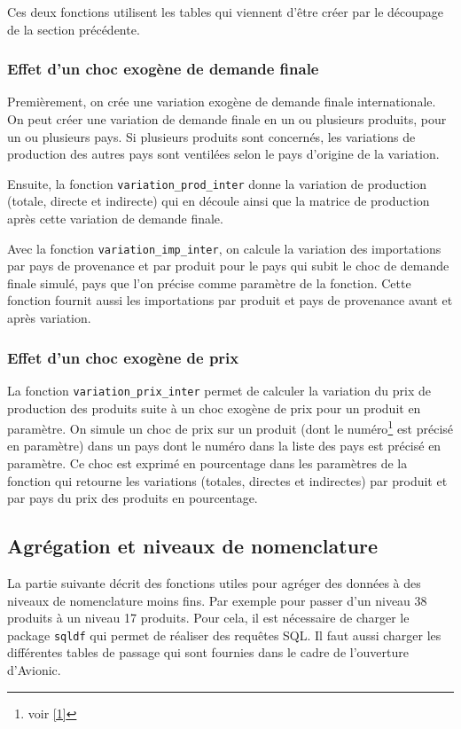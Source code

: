 \documentclass[a4paper,french,11pt]{article}
\begin{document}
Ces deux fonctions utilisent les tables qui viennent d'\^etre cr\'eer par le d\'ecoupage de la section pr\'ec\'edente.

\subsubsection{Effet d'un choc exog\`ene de demande finale}

Premi\`erement, on cr\'ee une variation exog\`ene de demande finale internationale. On peut cr\'eer une variation de demande finale en un ou plusieurs produits, pour un ou plusieurs pays. Si plusieurs produits sont concern\'es, les variations de production des autres pays sont ventil\'ees selon le pays d'origine de la variation.

Ensuite, la fonction \verb|variation_prod_inter| donne la variation de production (totale, directe et indirecte) qui en d\'ecoule ainsi que la matrice de production apr\`es cette variation de demande finale.

Avec la fonction \verb|variation_imp_inter|, on calcule la variation des importations par pays de provenance et par produit pour le pays qui subit le choc de demande finale simul\'e, pays que l'on pr\'ecise comme param\`etre de la fonction. Cette fonction fournit aussi les importations par produit et pays de provenance avant et apr\`es variation.

\subsubsection{Effet d'un choc exog\`ene de prix}

La fonction \verb|variation_prix_inter| permet de calculer la variation du prix de production des produits suite \`a un choc exog\`ene de prix pour un produit en param\`etre. On simule un choc de prix sur un produit (dont le num\'ero\footnote{voir \ref{1}} est pr\'ecis\'e en param\`etre) dans un pays dont le num\'ero dans la liste des pays est pr\'ecis\'e en param\`etre. Ce choc est exprim\'e en pourcentage dans les param\`etres de la fonction qui retourne les variations (totales, directes et indirectes) par produit et par pays du prix des produits en pourcentage.

\subsection{Agr\'egation et niveaux de nomenclature}

La partie suivante d\'ecrit des fonctions utiles pour agr\'eger des donn\'ees \`a des niveaux de nomenclature moins fins. Par exemple pour passer d'un niveau 38 produits \`a un niveau 17 produits. Pour cela, il est n\'ecessaire de charger le package \verb|sqldf| qui permet de r\'ealiser des requ\^etes SQL. Il faut aussi charger les diff\'erentes tables de passage qui sont fournies dans le cadre de l'ouverture d'Avionic.
\end{document}

